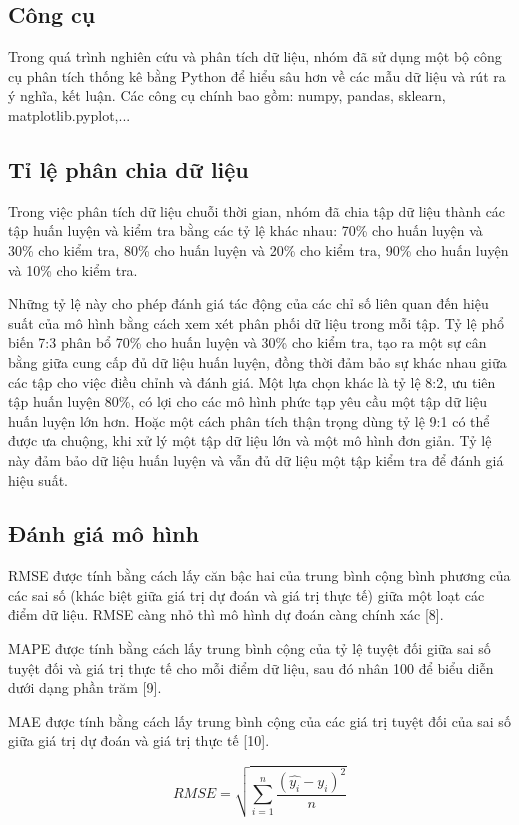 \documentclass[conference]{IEEEtran}
\begin{document}
\subsection{Công cụ}
Trong quá trình nghiên cứu và phân tích dữ liệu, nhóm đã sử dụng một bộ công cụ phân tích thống kê bằng Python để hiểu sâu hơn về các mẫu dữ liệu và rút ra ý nghĩa, kết luận. Các công cụ chính bao gồm: numpy, pandas, sklearn, matplotlib.pyplot,...


\subsection{Tỉ lệ phân chia dữ liệu}
    Trong việc phân tích dữ liệu chuỗi thời gian, nhóm đã chia tập dữ liệu thành các tập huấn luyện và kiểm tra bằng các tỷ lệ khác nhau: 70\% cho huấn luyện và 30\% cho kiểm tra, 80\% cho huấn luyện và 20\% cho kiểm tra, 90\% cho huấn luyện và 10\% cho kiểm tra. 

Những tỷ lệ này cho phép đánh giá tác động của các chỉ số liên quan đến hiệu suất của mô hình bằng cách xem xét phân phối dữ liệu trong mỗi tập. Tỷ lệ phổ biến 7:3 phân bổ 70\% cho huấn luyện và 30\% cho kiểm tra, tạo ra một sự cân bằng giữa cung cấp đủ dữ liệu huấn luyện, đồng thời đảm bảo sự khác nhau giữa các tập cho việc điều chỉnh và đánh giá. Một lựa chọn khác là tỷ lệ 8:2, ưu tiên tập huấn luyện 80\%, có lợi cho các mô hình phức tạp yêu cầu một tập dữ liệu huấn luyện lớn hơn. Hoặc một cách phân tích thận trọng dùng tỷ lệ 9:1 có thể được ưa chuộng, khi xử lý một tập dữ liệu lớn và một mô hình đơn giản. Tỷ lệ này đảm bảo dữ liệu huấn luyện và vẫn đủ dữ liệu một tập kiểm tra để đánh giá hiệu suất.

\subsection{Đánh giá mô hình}
RMSE được tính bằng cách lấy căn bậc hai của trung bình cộng bình phương của các sai số (khác biệt giữa giá trị dự đoán và giá trị thực tế) giữa một loạt các điểm dữ liệu. RMSE càng nhỏ thì mô hình dự đoán càng chính xác [8].

MAPE được tính bằng cách lấy trung bình cộng của tỷ lệ tuyệt đối giữa sai số tuyệt đối và giá trị thực tế cho mỗi điểm dữ liệu, sau đó nhân 100 để biểu diễn dưới dạng phần trăm [9].

MAE được tính bằng cách lấy trung bình cộng của các giá trị tuyệt đối của sai số giữa giá trị dự đoán và giá trị thực tế [10].

\[RMSE=\sqrt{\sum_{i=1}^{n} \frac{(\hat{y_i}-y_i )^2}{n} }\]\\
\end{document}
